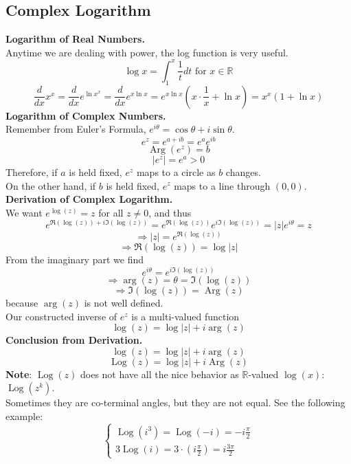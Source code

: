 \documentclass[11pt]{article}
\begin{document}
\subsection{Complex Logarithm}
\textbf{Logarithm of Real Numbers.} \\
Anytime we are dealing with power, the log function is very useful. 
\begin{equation*}
\log{x} = \int_{1}^{x} \frac{1}{t} dt \mbox{ for } x \in \mathbb{R}
\end{equation*}
$$\frac{d}{dx}x^x = \frac{d}{dx}e^{\ln{x^x}} = \frac{d}{dx}e^{x\ln x} = e^{x\ln x}(x \cdot \frac{1}{x} + \ln{x}) = x^x(1 + \ln{x})$$
\newline
\textbf{Logarithm of Complex Numbers.} \\
Remember from Euler's Formula, $e^{i\theta}= \cos\theta + i\sin\theta$. 
$$e^z = e^{a + ib} = e^ae^{ib}$$ 
$$\operatorname{Arg}(e^z) = b$$
$$|e^z| = e^a > 0$$ 
Therefore, if $a$ is held fixed, $e^z$ maps to a circle as $b$ changes. \\
On the other hand, if $b$ is held fixed, $e^z$ maps to a line through $(0, 0)$. \\
\newline
\textbf{Derivation of Complex Logarithm.} \\
We want $e^{\log{(z)}} = z$ for all $z \neq 0$, and thus 
$$e^{\Re(\log{(z)}) + i\Im(\log{(z)})} = e^{\Re(\log{(z)})}e^{i\Im(\log{(z)})} = |z|e^{i\theta} = z$$
$$\Rightarrow |z| = e^{\Re(\log{(z)})}$$ 
$$\Rightarrow \Re(\log{(z)}) = \log{|z|}$$
From the imaginary part we find 
$$e^{i\theta} = e^{i\Im(\log{(z)})}$$
$$\Rightarrow \operatorname{arg}(z) = \theta = \Im(\log{(z)})$$
$$\Rightarrow \Im(\log{(z)}) = \operatorname{Arg}(z)$$ 
because $\operatorname{arg}(z)$ is not well defined. \\
Our constructed inverse of $e^z$ is a multi-valued function 
$$\log(z) = \log|z| + i\operatorname{arg}(z)$$
\newline
\textbf{Conclusion from Derivation.}\\
$$\log(z) = \log|z| + i\operatorname{arg}(z)$$
$$\operatorname{Log} (z) = \log|z| + i\operatorname{Arg}(z)$$
\textbf{Note}: $\operatorname{Log}(z)$ does not have all the nice behavior as $\mathbb{R}$-valued $\log(x)$: $\operatorname{Log}{(z^k)}$. \\
Sometimes they are co-terminal angles, but they are not equal. See the following example: \\
\[ \begin{cases} 
      \operatorname{Log}(i^3) = \operatorname{Log}(-i) = -i\frac{\pi}{2} \\
      3\operatorname{Log}(i) = 3 \cdot (i\frac{\pi}{2}) = i\frac{3\pi}{2}
   \end{cases}
\]
\end{document}
